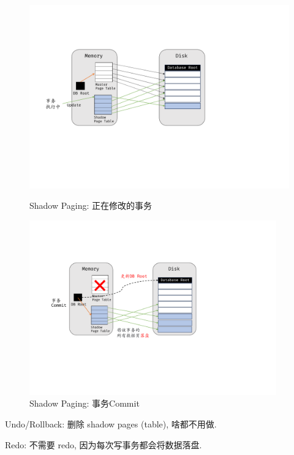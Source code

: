 \begin{figure}[H]
    \centering
    \begin{minipage}[b]{0.49\linewidth}
    \centering
    \includegraphics[width=\textwidth]{./figure/shadow-1.pdf}
    \caption{Shadow Paging: 正在修改的事务}
    \end{minipage}
    \hfill
    \begin{minipage}[b]{0.49\linewidth}
    \centering
    \includegraphics[width=0.95\textwidth]{./figure/shadow-2.pdf}
    \caption{Shadow Paging: 事务Commit}
    \end{minipage}
\end{figure}

Undo/Rollback: 删除 shadow pages (table), 啥都不用做.

Redo: 不需要 redo, 因为每次写事务都会将数据落盘.


